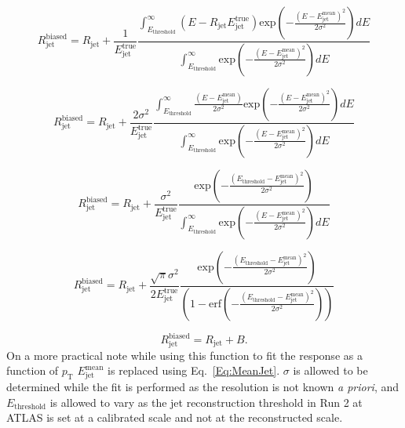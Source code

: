 \begin{equation}
  R_{\mathrm{jet}}^{\mathrm{biased}} = R_{\mathrm{jet}} + \frac{1}{E_{\mathrm{jet}}^{\mathrm{true}}} \frac{\int_{E_{\mathrm {threshold}}}^{\infty} \left(E - R_{\mathrm{jet}}E_{\mathrm{jet}}^{\mathrm{true}}\right)\mathrm{exp}\left( -\frac{\left(E-E_{\mathrm{jet}}^{\mathrm{mean}}\right)^2}{2\sigma^2}\right) dE}{\int_{E_{\mathrm {threshold}}}^{\infty}\mathrm{exp}\left( -\frac{\left(E-E_{\mathrm{jet}}^{\mathrm{mean}}\right)^2}{2\sigma^2}\right) dE} 
\end{equation}

\begin{equation}
  R_{\mathrm{jet}}^{\mathrm{biased}} = R_{\mathrm{jet}} + 
  \frac{
    2\sigma^2
   }{
     E_{\mathrm{jet}}^{\mathrm{true}}
   } 
   \frac{
     \int_{E_{\mathrm {threshold}}}^{\infty} 
     \frac{
       \left(E - E_{\mathrm{jet}}^{\mathrm{mean}}\right)
     }{
       2\sigma^2
     }\mathrm{exp}\left( -
     \frac{
       \left(E-E_{\mathrm{jet}}^{\mathrm{mean}}\right)^2
     }{
       2\sigma^2
     }\right) dE
   }{
     \int_{E_{\mathrm {threshold}}}^{\infty}\mathrm{exp}\left( -
     \frac{
       \left(E-E_{\mathrm{jet}}^{\mathrm{mean}}\right)^2
     }{
      2\sigma^2}\right) dE
     } 
\end{equation}


\begin{equation}
  R_{\mathrm{jet}}^{\mathrm{biased}} = R_{\mathrm{jet}} + 
    \frac{
      \sigma^2
    }
    {E_{\mathrm{jet}}^{\mathrm{true}}} 
    \frac{
      \mathrm{exp}\left( -
      \frac{
        \left(E_{\mathrm {threshold}}-E_{\mathrm{jet}}^{\mathrm{mean}}\right)^2
      }
      {2\sigma^2}\right)
    }
    {\int_{E_{\mathrm {threshold}}}^{\infty}\mathrm{exp}\left( -\frac{\left(E-E_{\mathrm{jet}}^{\mathrm{mean}}\right)^2}{2\sigma^2}\right) dE} 
\end{equation}

\begin{equation}
  R_{\mathrm{jet}}^{\mathrm{biased}} = R_{\mathrm{jet}} + 
    \frac{
      \sqrt{\pi}\sigma^2
    }
    {2E_{\mathrm{jet}}^{\mathrm{true}}} 
    \frac{
      \mathrm{exp}\left( -
      \frac{
        \left(E_{\mathrm {threshold}}-E_{\mathrm{jet}}^{\mathrm{mean}}\right)^2
      }
      {2\sigma^2}\right)
    }
    {\left(1-\mathrm{erf}\left( -\frac{\left(E_{\mathrm {threshold}}-E_{\mathrm{jet}}^{\mathrm{mean}}\right)^2}{2\sigma^2}\right)\right)}
\end{equation}

\begin{equation}
  R_{\mathrm{jet}}^{\mathrm{biased}} = R_{\mathrm{jet}} + B.
\end{equation}
On a more practical note while using this function to fit the response as a function of $p_{\mathrm T}$ $E_{\mathrm{jet}}^{\mathrm{mean}}$ is replaced using Eq.~\ref{Eq:MeanJet}.  
$\sigma$ is allowed to be determined while the fit is performed as the resolution is not known \textit{a priori}, and $E_{\mathrm {threshold}}$ is allowed to vary as the jet reconstruction threshold in Run 2 at ATLAS is set at a calibrated scale and not at the reconstructed scale.  


